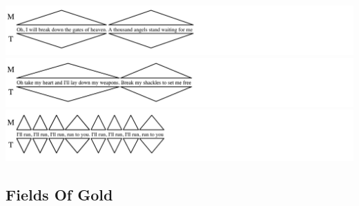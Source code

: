 \includegraphics[width=\textwidth]{resources/trees/rty-br-1.png}
\includegraphics[width=\textwidth]{resources/trees/rty-br-2.png}
\includegraphics[width=\textwidth]{resources/trees/rty-r.png}

\subsection*{Fields Of Gold}

